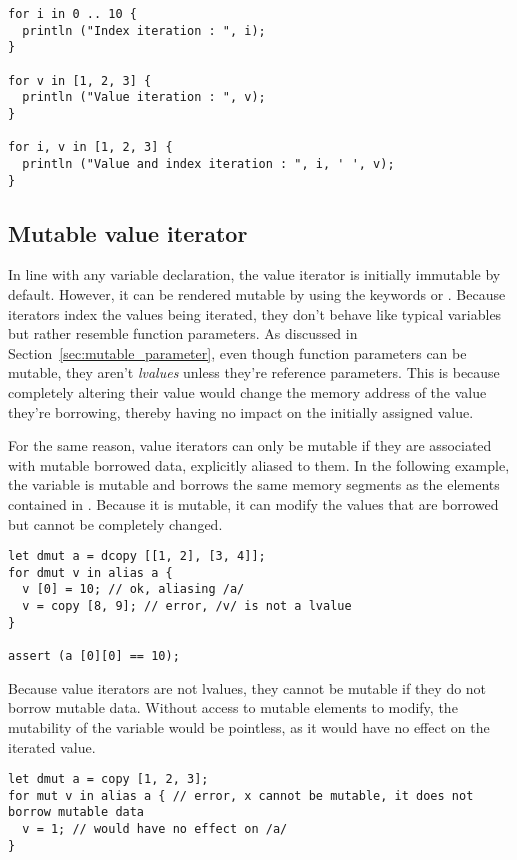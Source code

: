 \begin{lstlisting}[style=coloredverbatim]
for i in 0 .. 10 {
  println ("Index iteration : ", i);
}

for v in [1, 2, 3] {
  println ("Value iteration : ", v);
}

for i, v in [1, 2, 3] {
  println ("Value and index iteration : ", i, ' ', v);
}
\end{lstlisting}

\subsection {Mutable value iterator}

In line with any variable declaration, the value iterator is initially immutable
by default. However, it can be rendered mutable by using the keywords
 or . Because iterators index the values being iterated,
they don't behave like typical variables but rather resemble function
parameters. As discussed in Section~\ref{sec:mutable_parameter}, even though
function parameters can be mutable, they aren't \textit{lvalues} unless they're
reference parameters. This is because completely altering their value would
change the memory address of the value they're borrowing, thereby having no
impact on the initially assigned value.

For the same reason, value iterators can only be mutable if they are associated
with mutable borrowed data, explicitly aliased to them. In the following
example, the variable  is mutable and borrows the same memory segments
as the elements contained in . Because it is mutable, it can modify
the values that are borrowed but cannot be completely changed.

\begin{lstlisting}[style=coloredverbatim]
let dmut a = dcopy [[1, 2], [3, 4]];
for dmut v in alias a {
  v [0] = 10; // ok, aliasing /a/
  v = copy [8, 9]; // error, /v/ is not a lvalue
}

assert (a [0][0] == 10);
\end{lstlisting}

Because value iterators are not lvalues, they cannot be mutable if they do not
borrow mutable data. Without access to mutable elements to modify, the
mutability of the variable would be pointless, as it would have no effect on the
iterated value.

\begin{lstlisting}[style=coloredverbatim]
let dmut a = copy [1, 2, 3];
for mut v in alias a { // error, x cannot be mutable, it does not borrow mutable data
  v = 1; // would have no effect on /a/
}
\end{lstlisting}

